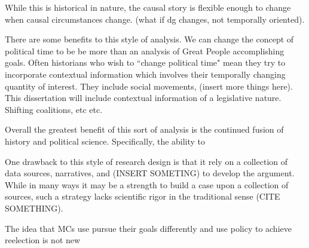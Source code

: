 \documentclass[12pt]{article}
\begin{document}
While this is historical in nature, the causal story is flexible enough to change when causal circumstances change. (what if dg changes, not temporally oriented).


There are some benefits to this style of analysis. We can change the concept of political time to be be more than an analysis of Great People accomplishing goals. Often historians who wish to ``change political time" mean they try to incorporate contextual information which involves their temporally changing quantity of interest. They include social movements, (insert more things here). This dissertation will include contextual information of a legislative nature. Shifting coalitions, etc etc.

Overall the greatest benefit of this sort of analysis is the continued fusion of history and political science. Specifically, the ability to 

One drawback to this style of research design is that it rely on a collection of data sources, narratives, and (INSERT SOMETING) to develop the argument. While in many ways it may be a strength to build a case upon a collection of sources, such a strategy lacks scientific rigor in the traditional sense (CITE SOMETHING). 


The idea that MCs use pursue their goals differently and use policy to achieve reelection is not new \citep{fenno1973, kernell1999}


\newpage
    {}


\end{document}
